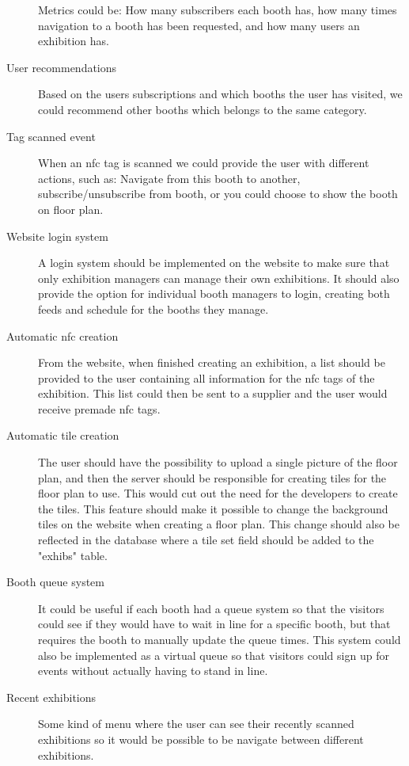 \begin{description}
Metrics could be: How many subscribers each booth has, how many times navigation to a booth has been requested, and how many users an exhibition has.
\item[User recommendations] Based on the users subscriptions and which booths the user has visited, we could recommend other booths which belongs to the same category.
\item[Tag scanned event] When an \ac{nfc} tag is scanned we could provide the user with different actions, such as: Navigate from this booth to another, subscribe/unsubscribe from booth, or you could choose to show the booth on floor plan.
\item[Website login system] A login system should be implemented on the website to make sure that only exhibition managers can manage their own exhibitions. It should also provide the option for individual booth managers to login, creating both feeds and schedule for the booths they manage.
\item[Automatic \ac{nfc} creation] From the website, when finished creating an exhibition, a list should be provided to the user containing all information for the \ac{nfc} tags of the exhibition. This list could then be sent to a supplier and the user would receive premade \ac{nfc} tags.
\item[Automatic tile creation] The user should have the possibility to upload a single picture of the floor plan, and then the server should be responsible for creating tiles for the floor plan to use. This would cut out the need for the developers to create the tiles. This feature should make it possible to change the background tiles on the website when creating a floor plan. This change should also be reflected in the database where a tile set field should be added to the "exhibs" table.
\item[Booth queue system] It could be useful if each booth had a queue system so that the visitors could see if they would have to wait in line for a specific booth, but that requires the booth to manually update the queue times. This system could also be implemented as a virtual queue so that visitors could sign up for events without actually having to stand in line.
\item[Recent exhibitions] Some kind of menu where the user can see their recently scanned exhibitions so it would be possible to be navigate between different exhibitions. 

\end{description}
